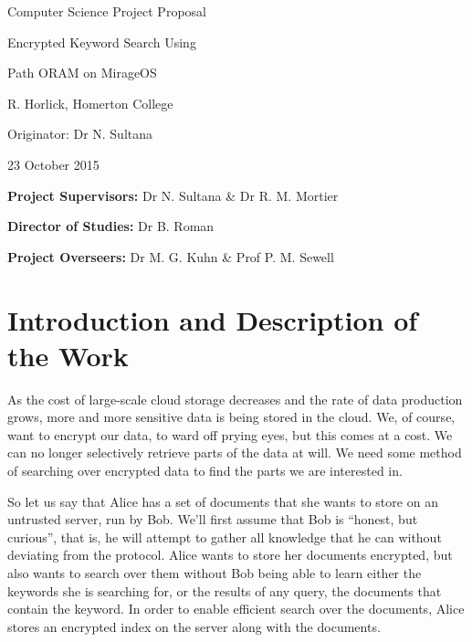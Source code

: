 \documentclass[12pt,a4paper,twoside]{article}
\begin{document}


\vfil

\centerline{\Large Computer Science Project Proposal}
\vspace{0.4in}
\centerline{\Large Encrypted Keyword Search Using}
\vspace{0.05in}
\centerline{\Large Path ORAM on MirageOS}
\vspace{0.4in}
\centerline{\large R. Horlick, Homerton College}
\vspace{0.3in}
\centerline{\large Originator: Dr N. Sultana}
\vspace{0.3in}
\centerline{\large 23 October 2015}

\vfil


\noindent
{\bf Project Supervisors:} Dr N. Sultana \& Dr R. M. Mortier
\vspace{0.2in}

\noindent
{\bf Director of Studies:} Dr B. Roman
\vspace{0.2in}
\noindent
 
\noindent
{\bf Project Overseers:} Dr M. G. Kuhn \& Prof P. M. Sewell



\section*{Introduction and Description of the Work}


As the cost of large-scale cloud storage decreases and the rate of data production grows, more and more sensitive data is being stored in the cloud. We, of course, want to encrypt our data, to ward off prying eyes, but this comes at a cost. We can no longer selectively retrieve parts of the data at will. We need some method of searching over encrypted data to find the parts we are interested in.


So let us say that Alice has a set of documents that she wants to store on an untrusted server, run by Bob. We'll first assume that Bob is ``honest, but curious'', that is, he will attempt to gather all knowledge that he can without deviating from the protocol. Alice wants to store her documents encrypted, but also wants to search over them without Bob being able to learn either the keywords she is searching for, or the results of any query, the documents that contain the keyword. In order to enable efficient search over the documents, Alice stores an encrypted index on the server along with the documents.
\end{document}
